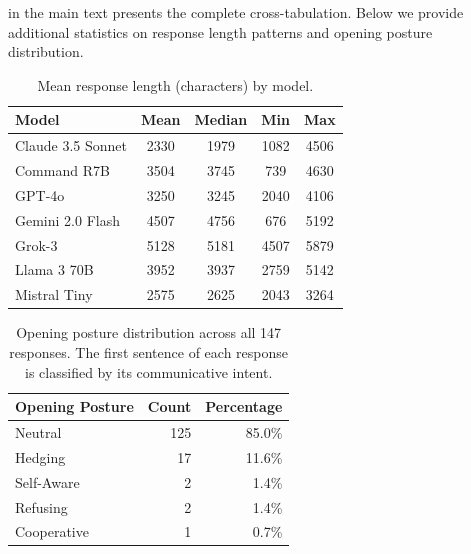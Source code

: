 \documentclass[11pt]{article}
\begin{document}
 in the main text presents the complete cross-tabulation.
Below we provide additional statistics on response length patterns and opening posture distribution.

\begin{table}[h]
\centering
\caption{Mean response length (characters) by model.}
\small
\begin{tabular}{@{}lcccc@{}}
\toprule
\textbf{Model} & \textbf{Mean} & \textbf{Median} & \textbf{Min} & \textbf{Max} \\
\midrule
Claude 3.5 Sonnet & 2330 & 1979 & 1082 & 4506 \\
Command R7B & 3504 & 3745 & 739 & 4630 \\
GPT-4o & 3250 & 3245 & 2040 & 4106 \\
Gemini 2.0 Flash & 4507 & 4756 & 676 & 5192 \\
Grok-3 & 5128 & 5181 & 4507 & 5879 \\
Llama 3 70B & 3952 & 3937 & 2759 & 5142 \\
Mistral Tiny & 2575 & 2625 & 2043 & 3264 \\
\bottomrule
\end{tabular}
\end{table}

\begin{table}[h]
\centering
\caption{Opening posture distribution across all 147 responses. The first sentence of each response is classified by its communicative intent.}
\small
\begin{tabular}{@{}lrr@{}}
\toprule
\textbf{Opening Posture} & \textbf{Count} & \textbf{Percentage} \\
\midrule
Neutral & 125 & 85.0\% \\
Hedging & 17 & 11.6\% \\
Self-Aware & 2 & 1.4\% \\
Refusing & 2 & 1.4\% \\
Cooperative & 1 & 0.7\% \\
\bottomrule
\end{tabular}
\end{table}
\end{document}
